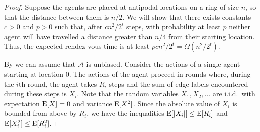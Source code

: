 \documentclass[acmtoalg]{acmtrans2m}
\newcommand{\A}{\mathcal{A}}
\begin{document}
\begin{proof}
Suppose the agents are placed at antipodal locations on a ring of size
$n$,
so that the distance between them is $n/2$.  We will show that there
exists constants $c >0$ and $p> 0$ such that, after $cn^2/2^t$ steps,
with probability at least $p$ neither agent will have travelled a
distance greater than $n/4$ from their starting location.  Thus, the
expected rendez-vous time is at least $p cn^2/2^t = \Omega(n^2/2^t)$.

By  we can assume that $\A$ is unbiased.
Consider the actions of a single agent starting at location 0.  The
actions of the agent proceed in rounds where, during the $i$th round,
the agent takes $R_i$ steps and the sum of edge labels encountered
during these steps is $X_i$.  Note that the random variables
$X_1,X_2,\ldots$ are i.i.d.\ with expectation $\mathrm{E}[X]=0$ and variance
$\mathrm{E}[X^2]$. Since the absolute value of $X_i$ is bounded from above by
$R_i$, we have the inequalities $\mathrm{E}[|X_i|]\le \mathrm{E}[R_i]$ and
$\mathrm{E}[X_i^2]\le\mathrm{E}[R_i^2]$. 


\end{proof}
\end{document}

